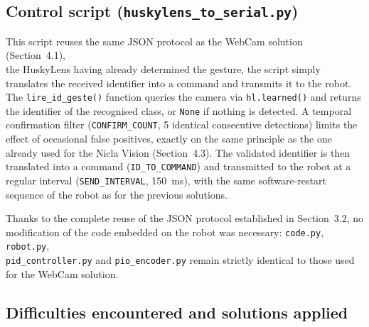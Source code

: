 \documentclass[12pt,a4paper]{report}
\begin{document}
	\subsection*{Control script (\texttt{huskylens\_to\_serial.py})}
	
	This script reuses the same JSON protocol as the WebCam solution (Section~4.1), \\ the HuskyLens having already determined the gesture, the script simply translates the received identifier into a command and transmits it to the robot. The \texttt{lire\_id\_geste()} function queries the camera via \texttt{hl.learned()} and returns the identifier of the recognised class, or \texttt{None} if nothing is detected. A temporal confirmation filter (\texttt{CONFIRM\_COUNT}, 5 identical consecutive detections) limits the effect of occasional false positives, exactly on the same principle as the one already used for the Nicla Vision (Section~4.3). The validated identifier is then translated into a command (\texttt{ID\_TO\_COMMAND}) and transmitted to the robot at a regular interval (\texttt{SEND\_INTERVAL}, 150~ms), with the same software-restart sequence of the robot as for the previous solutions.
	
	Thanks to the complete reuse of the JSON protocol established in Section~3.2, no modification of the code embedded on the robot was necessary: \texttt{code.py}, \texttt{robot.py}, \\ \texttt{pid\_controller.py} and \texttt{pio\_encoder.py} remain strictly identical to those used for the WebCam solution.
	
	\subsection*{Difficulties encountered and solutions applied}
	
\end{document}
